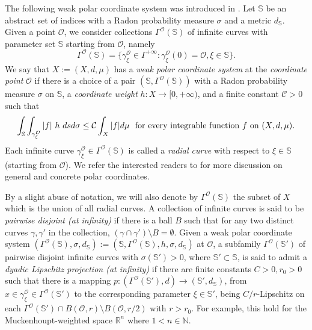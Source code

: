 \documentclass[10pt]{amsart}
\numberwithin{equation}{section}
\begin{document}
The following weak polar coordinate system was introduced in \cite{KN22}.
{
Let $\mathbb S$ be an abstract set of indices with a Radon probability measure $\sigma$ and a metric $d_{\mathbb S}$.}
Given a point $\mathcal O$, we  consider collections $\Gamma^{\mathcal O}(\mathbb S)$ of infinite curves with parameter set $\mathbb S$ starting from $\mathcal O$, namely
\[\Gamma^{\mathcal O}(\mathbb S)=\{\gamma^{\mathcal O}_\xi\in\Gamma^{+\infty}: \gamma_\xi^{\mathcal O}(0)=\mathcal O, \xi\in\mathbb S\}.
\]
We say that $X:=(X,d,\mu)$  has a   \textit{weak polar coordinate system} at the \textit{coordinate point} $\mathcal O$ if there is a choice of a pair $(\mathbb S, \Gamma^{\mathcal O}(\mathbb S))$  with a  Radon probability measure $\sigma$ on $\mathbb S$, a \textit{coordinate weight} $h:X\to\mathbb [0,{+\infty})$, and a finite constant $\mathcal C>0$ such that 
\begin{equation}\label{polar-0103}
\int_{\mathbb S}\int_{\gamma^{\mathcal O}_\xi}|f|\ h\ dsd\sigma\leq\mathcal C \int_{X}|f|d\mu \text{\rm \ \ for every integrable function $f$ on $(X,d,\mu)$.}
\end{equation}
Each infinite curve $\gamma_\xi^{\mathcal O}\in\Gamma^{\mathcal O}(\mathbb S)$ is called a   \textit{radial curve} with respect to $\xi\in\mathbb S$ (starting from $\mathcal O$). We refer the interested readers to \cite[Section 2.1]{KN22} for more discussion on general and concrete polar  coordinates.

By a slight abuse of notation, we will also denote by $\Gamma^{\mathcal O}(\mathbb S)$  the subset of  $X$ which is the union of all   radial curves. 
{
A collection of infinite curves is said to be  \emph{pairwise disjoint (at infinity)}  if there is a ball $B$ such that for any two distinct curves $\gamma, \gamma'$ in the collection, $(\gamma\cap\gamma' ) \setminus B=\emptyset$. Given a weak polar coordinate system $(\Gamma^{\mathcal O}(\mathbb S),\sigma, d_{\mathbb S}):=(\mathbb S,\Gamma^{\mathcal O}(\mathbb S), h, \sigma, d_{\mathbb S})$ at $\mathcal O$, 
a subfamily $\Gamma^{\mathcal O}(\mathbb S')$  of pairwise disjoint infinite curves with $\sigma(\mathbb S')>0$, where $\mathbb S'\subset\mathbb S$, is said to admit a \emph{dyadic Lipschitz projection (at infinity)}  if  there are finite constants $C>0, r_0>0$ such that   there is a  mapping $p: (\Gamma^{\mathcal O}(\mathbb S'), d)\to (\mathbb S', d_{\mathbb S})$, from $x\in\gamma_\xi^{\mathcal O}\in \Gamma^{\mathcal O}(\mathbb S')$ to the corresponding parameter $\xi\in\mathbb S'$,  being  $C/r$-Lipschitz on each  $\Gamma^{\mathcal O}(\mathbb S')\cap B(\mathcal O,r)\setminus B(\mathcal O,r/2)$ with $r>r_0$. 
For example, this hold for the Muckenhoupt-weighted space $\mathbb R^n$ where $1<n\in\mathbb N$.
}
\end{document}
